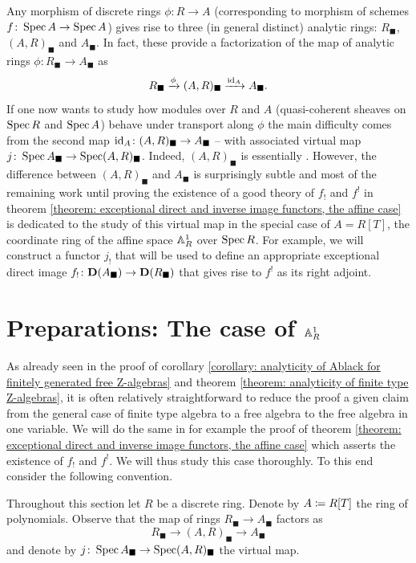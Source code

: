 \begin{remark}
	Any morphism of discrete rings $\phi\colon R\to A$ (corresponding to morphism of schemes $f\colon \operatorname{Spec} A\to \operatorname{Spec} A$) gives rise to three (in general distinct) analytic rings: $R_\blacksquare$, $(A, R)_\blacksquare$ and $A_\blacksquare$. In fact, these provide a factorization of the map of analytic rings $\phi\colon R_\blacksquare \to A_\blacksquare$ as
		$$R_\blacksquare \xrightarrow{\phi} (A, R)_\blacksquare \xrightarrow{\mathrm{id}_A} A_\blacksquare.$$
	If one now wants to study how modules over $R$ and $A$ (\ie quasi-coherent sheaves on $\operatorname{Spec} R$ and $\operatorname{Spec} A$) behave under transport along $\phi$ the main difficulty comes from the second map $\mathrm{id}_A\colon (A, R)_\blacksquare\to A_\blacksquare$ -- with associated virtual map $j\colon \operatorname{Spec} A_\blacksquare\to\operatorname{Spec}(A, R)_\blacksquare$. Indeed, $(A, R)_\blacksquare$ is essentially . However, the difference between $(A, R)_\blacksquare$ and $A_\blacksquare$ is surprisingly subtle and most of the remaining work until proving the existence of a good theory of $f_!$ and $f^!$ in theorem \ref{theorem: exceptional direct and inverse image functors, the affine case} is dedicated to the study of this virtual map in the special case of $A=R[T]$, the coordinate ring of the affine space ${\mathbb{A}}_R^1$ over $\operatorname{Spec} R$. For example, we will construct a functor $j_!$ that will be used to define an appropriate exceptional direct image $f_!\colon {{\mathbf{D}}(A_\blacksquare)}\to{{\mathbf{D}}(R_\blacksquare)}$ that gives rise to $f^!$ as its right adjoint.
\end{remark}

\section{Preparations: The case of \texorpdfstring{${\mathbb{A}}_R^1$}{Affine Space over an Affine Base}}

As already seen in the proof of corollary \ref{corollary: analyticity of Ablack for finitely generated free Z-algebras} and theorem \ref{theorem: analyticity of finite type Z-algebras}, it is often relatively straightforward to reduce the proof a given claim from the general case of finite type algebra to a free algebra to the free algebra in one variable. We will do the same in for example the proof of theorem \ref{theorem: exceptional direct and inverse image functors, the affine case} which asserts the existence of $f_!$ and $f^!$. We will thus study this case thoroughly. To this end consider the following convention.
\begin{convention}
	Throughout this section let $R$ be a discrete ring. Denote by $A\coloneqq R[T]$ the ring of polynomials. Observe that the map of rings $R_\blacksquare \to A_\blacksquare$ factors as
		$$R_\blacksquare \to (A, R)_\blacksquare \to A_\blacksquare$$
	and denote by $j\colon \operatorname{Spec} A_\blacksquare \to \operatorname{Spec} (A, R)_\blacksquare$ the virtual map.
\end{convention}

